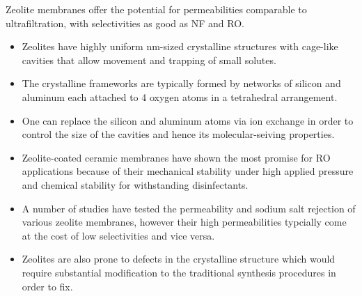   Zeolite membranes offer the potential for permeabilities comparable to ultrafiltration, 
  with selectivities as good as NF and RO.~\cite{hoek_nanotechnology-based_2014}
  \begin{itemize}  
    \item Zeolites have highly uniform nm-sized crystalline structures with cage-like
    cavities that allow movement and trapping of small solutes. 
    \item The crystalline frameworks are typically formed by networks of silicon 
    and aluminum each attached to 4 oxygen atoms in a tetrahedral arrangement.~\cite{auerbach_handbook_2003}
    \item One can replace the silicon and aluminum atoms via ion exchange in order
    to control the size of the cavities and hence its molecular-seiving properties.~\cite{li_novel_2007}
    \item Zeolite-coated ceramic membranes have shown the most promise for RO applications
    because of their mechanical stability under high applied pressure and chemical
    stability for withstanding disinfectants.~\cite{pendergast_review_2011}
    \item A number of studies have tested the permeability and sodium salt rejection
    of various zeolite membranes, however their high permeabilities typcially come
    at the cost of low selectivities and vice versa.~\cite{li_desalination_2004,duke_seawater_2009}
    \item Zeolites are also prone to defects in the crystalline structure which 
    would require substantial modification to the traditional synthesis procedures
    in order to fix.~\cite{kumakiri_application_2000}
  \end{itemize}


